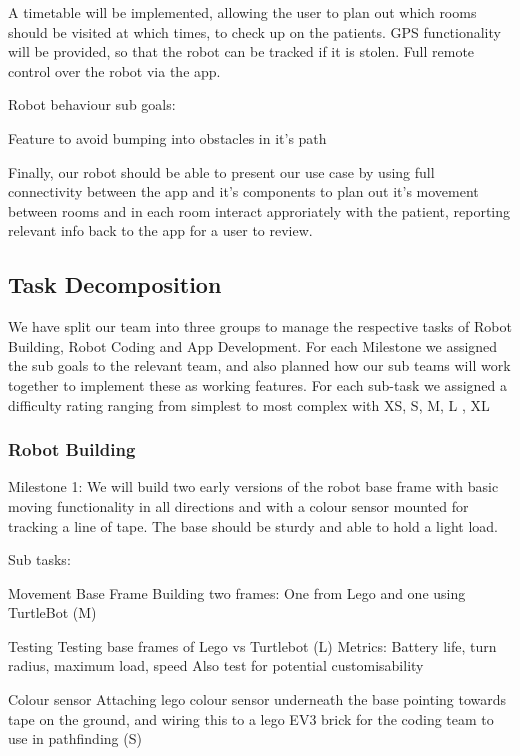 \documentclass{article}
\begin{document}
A timetable will be implemented, allowing the user to plan out which rooms should be visited at which times, to check up on the patients.
GPS functionality will be provided, so that the robot can be tracked if it is stolen.
Full remote control over the robot via the app.

Robot behaviour sub goals:

Feature to avoid bumping into obstacles in it's path

Finally, our robot should be able to present our use case by using full connectivity between the app and it's components to plan out it's movement between rooms and in each room interact approriately with the patient, reporting relevant info back to the app for a user to review.


\subsection{Task Decomposition}

We have split our team into three groups to manage the respective tasks of Robot Building, Robot Coding and App Development. For each Milestone we assigned the sub goals to the relevant team, and also planned how our sub teams will work together to implement these as working features.
For each sub-task we assigned a difficulty rating ranging from simplest to most complex with XS, S, M, L , XL


\subsubsection{Robot Building}

Milestone 1: We will build two early versions of the robot base frame with basic moving functionality in all directions and with a colour sensor mounted for tracking a line of tape. The base should be sturdy and able to hold a light load. 

Sub tasks:

Movement Base Frame
    Building two frames: One from Lego and one using TurtleBot (M)
    
Testing
    Testing base frames of Lego vs Turtlebot (L)
    Metrics: Battery life, turn radius, maximum load, speed
    Also test for potential customisability
    
Colour sensor
    Attaching lego colour sensor underneath the base pointing towards tape on the ground, and wiring this to a lego EV3 brick for the       coding team to use in pathfinding (S)
    
\end{document}
